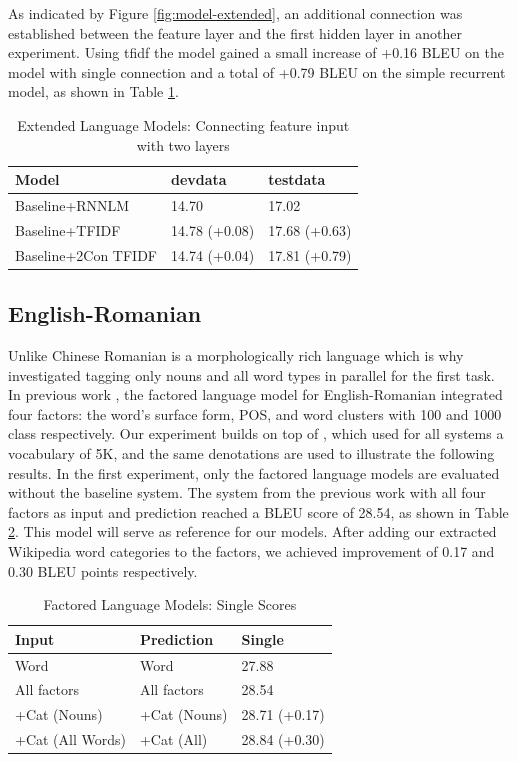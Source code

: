 \documentclass[a4paper]{article}
\begin{document}
As indicated by Figure \ref{fig:model-extended}, an additional connection was established between the feature layer and the first hidden layer in another experiment. Using tfidf the model gained a small increase of +0.16 BLEU on the model with single connection and a total of +0.79 BLEU on the simple recurrent model, as shown in Table \ref{tb:zh-extended-both}.


\begin{table}
\caption{Extended Language Models: Connecting feature input with two layers}
\centering
  \begin{tabular}{lll}
  	\hline
  	Model               & devdata       & testdata      \\ \hline\hline
  	Baseline+RNNLM      & 14.70         & 17.02         \\ \hline
  	Baseline+TFIDF      & 14.78 (+0.08) & 17.68 (+0.63) \\
  	Baseline+2Con TFIDF & 14.74 (+0.04) & 17.81 (+0.79)
  \end{tabular}
  \label{tb:zh-extended-both}
\end{table}


\subsection{English-Romanian}
Unlike Chinese Romanian is a morphologically rich language which is why investigated tagging only nouns and all word types in parallel for the first task. 
In previous work \cite{niehuesusing}, the factored language model for English-Romanian integrated four factors: the word's surface form, POS, and word clusters with 100 and 1000 class respectively. Our experiment builds on top of \cite{niehuesusing}, which used for all systems a vocabulary of 5K, and the same denotations are used to illustrate the following results. In the first experiment, only the factored language models are evaluated without the baseline system. The system from the previous work with all four factors as input and prediction reached a BLEU score of 28.54, as shown in Table \ref{tb:ro-factored-single}. This model will serve as reference for our models. After adding our extracted Wikipedia word categories to the factors, we achieved improvement of 0.17 and 0.30 BLEU points respectively.


\begin{table}
\caption{Factored Language Models: Single Scores}
\centering
  \begin{tabular}{lll}
  	\hline
  	Input            & Prediction   & Single        \\ \hline\hline
  	Word             & Word         & 27.88         \\
  	All factors      & All factors  & 28.54         \\ \hline
  	+Cat (Nouns)     & +Cat (Nouns) & 28.71 (+0.17) \\
  	+Cat (All Words) & +Cat (All)   & 28.84 (+0.30)
  \end{tabular}
  \label{tb:ro-factored-single}
\end{table}
\end{document}

